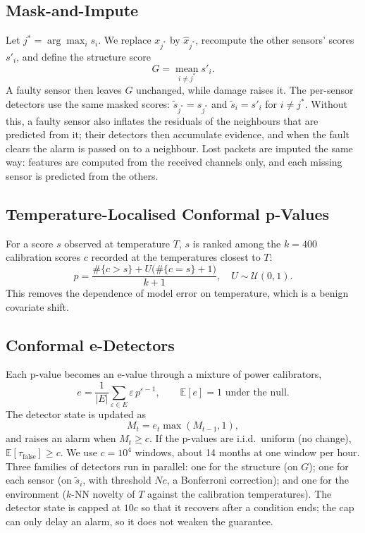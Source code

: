 \documentclass[conference]{IEEEtran}
\begin{document}
\subsection{Mask-and-Impute}
Let $j^*=\arg\max_i s_i$. We replace $x_{j^*}$ by $\hat{x}_{j^*}$, recompute the other sensors' scores $s'_i$, and define the structure score
\begin{equation}
G = \operatorname*{mean}_{i\neq j^*} s'_i .
\end{equation}
A faulty sensor then leaves $G$ unchanged, while damage raises it. The per-sensor detectors use the same masked scores: $\tilde{s}_{j^*}=s_{j^*}$ and $\tilde{s}_i=s'_i$ for $i\neq j^*$. Without this, a faulty sensor also inflates the residuals of the neighbours that are predicted from it; their detectors then accumulate evidence, and when the fault clears the alarm is passed on to a neighbour. Lost packets are imputed the same way: features are computed from the received channels only, and each missing sensor is predicted from the others.

\subsection{Temperature-Localised Conformal p-Values}
For a score $s$ observed at temperature $T$, $s$ is ranked among the $k=400$ calibration scores $c$ recorded at the temperatures closest to $T$:
\begin{equation}
p = \frac{\#\{c>s\} + U\big(\#\{c=s\}+1\big)}{k+1},\quad U\sim\mathcal{U}(0,1).
\end{equation}
This removes the dependence of model error on temperature, which is a benign covariate shift.

\subsection{Conformal e-Detectors}
Each p-value becomes an e-value through a mixture of power calibrators,
\begin{equation}
e = \frac{1}{|E|}\sum_{\varepsilon\in E}\varepsilon\,p^{\varepsilon-1},\qquad \mathbb{E}[e]=1 \text{ under the null.}
\end{equation}
The detector state is updated as
\begin{equation}
M_t = e_t \max(M_{t-1}, 1),
\end{equation}
and raises an alarm when $M_t\geq c$. If the p-values are i.i.d.\ uniform (no change), $\mathbb{E}[\tau_{\text{false}}]\geq c$. We use $c=10^4$ windows, about 14 months at one window per hour. Three families of detectors run in parallel: one for the structure (on $G$); one for each sensor (on $\tilde{s}_i$, with threshold $Nc$, a Bonferroni correction); and one for the environment ($k$-NN novelty of $T$ against the calibration temperatures). The detector state is capped at $10c$ so that it recovers after a condition ends; the cap can only delay an alarm, so it does not weaken the guarantee.
\end{document}
